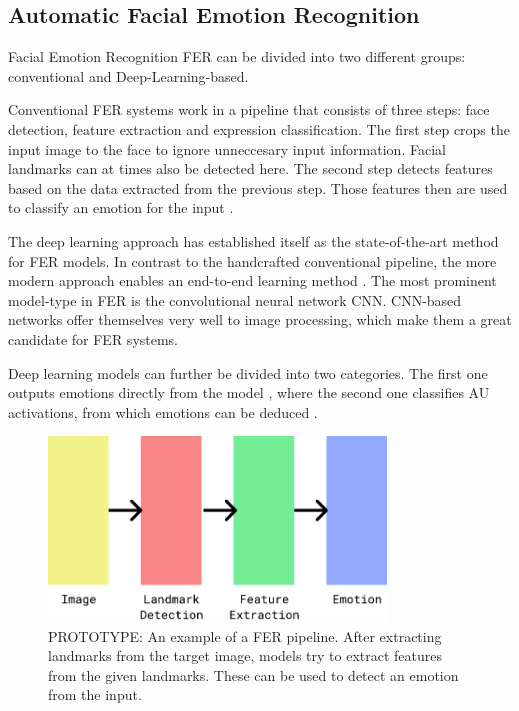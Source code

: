 \subsection{Automatic Facial Emotion Recognition}
Facial Emotion Recognition FER can be divided into two different groups: conventional and Deep-Learning-based. \cite{ko2018brief}

Conventional FER systems work in a pipeline that consists of three steps: face detection, feature extraction and expression classification. The first step crops the input image to the face to ignore unneccesary input information. Facial landmarks can at times also be detected here. The second step detects features based on the data extracted from the previous step. Those features then are used to classify an emotion for the input \cite{ko2018brief}.

The deep learning approach has established itself as the state-of-the-art method for FER models. In contrast to the handcrafted conventional pipeline, the more modern approach enables an end-to-end learning method \cite{ko2018brief}. The most prominent model-type in FER is the convolutional neural network CNN. CNN-based networks offer themselves very well to image processing, which make them a great candidate for FER systems. 

Deep learning models can further be divided into two categories. The first one outputs emotions directly from the model \cite{ebrahimi2015recurrent} \cite{kim2017multi} \cite{jung2015joint}, where the second one classifies AU activations, from which emotions can be deduced \cite{breuer2017deep} \cite{zhao2016deep} \cite{chu2017learning}. 

\begin{figure}
    \centering
    \includegraphics[width=0.8\textwidth]{res/PipelinePrototype.pdf}
    \caption{PROTOTYPE: An example of a FER pipeline. After extracting landmarks from the target image, models try to extract features from the given landmarks. These can be used to detect an emotion from the input.}
    \label{fig:pipeline_fer}
\end{figure}

